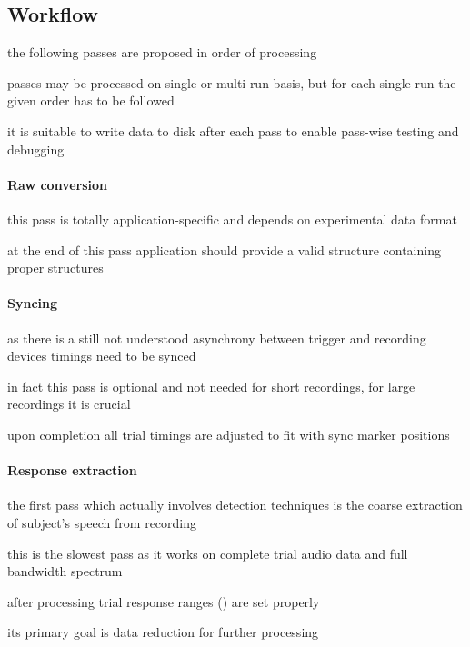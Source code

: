 \subsection{Workflow}
\begin{itemize*}
	\item the following passes are proposed in order of processing
	\item passes may be processed on single or multi-run basis, but for each single run the given order has to be followed
	\item it is suitable to write data to disk after each pass to enable pass-wise testing and debugging
\end{itemize*}

\paragraph{Raw conversion}
\begin{itemize*}
	\item this pass is totally application-specific and depends on experimental data format
	\item at the end of this pass application should provide a valid  structure containing proper  structures
\end{itemize*}

\paragraph{Syncing}
\begin{itemize*}
	\item as there is a still not understood asynchrony between trigger and recording devices timings need to be synced
	\item in fact this pass is optional and not needed for short recordings, for large recordings it is crucial
	\item upon completion all trial timings are adjusted to fit with sync marker positions
\end{itemize*}

\paragraph{Response extraction}
\begin{itemize*}
	\item the first pass which actually involves detection techniques is the coarse extraction of subject's speech from recording
	\item this is the slowest pass as it works on complete trial audio data and full bandwidth spectrum
	\item after processing trial response ranges () are set properly
	\item its primary goal is data reduction for further processing
\end{itemize*}

